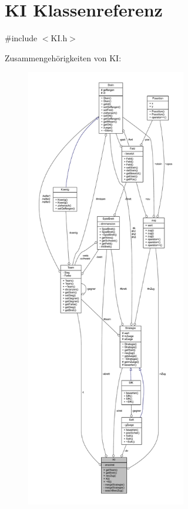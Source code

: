 \hypertarget{class_k_i}{}\section{K\+I Klassenreferenz}
\label{class_k_i}


{\ttfamily \#include $<$K\+I.\+h$>$}



Zusammengehörigkeiten von K\+I\+:\nopagebreak
\begin{figure}[H]
\begin{center}
\leavevmode
\includegraphics[height=550pt]{class_k_i__coll__graph}
\end{center}
\end{figure}

